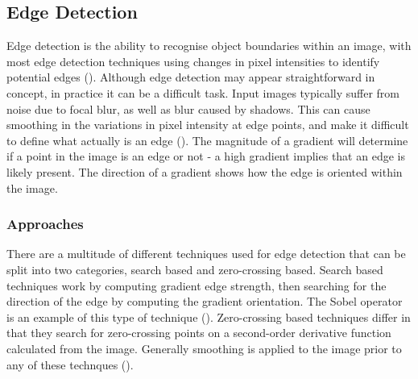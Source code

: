 \documentclass[12pt]{report}
\begin{document}
\subsection{Edge Detection}
\begin{flushleft}
Edge detection is the ability to recognise object boundaries within an image, with most edge detection techniques using changes in pixel intensities to identify potential edges (\cite{arbelaez2011contour}). Although edge detection may appear straightforward in concept, in practice it can be a difficult task. Input images typically suffer from noise due to focal blur, as well as blur caused by shadows. This can cause smoothing in the variations in pixel intensity at edge points, and make it difficult to define what actually is an edge (\cite{ziou1998edge}). The magnitude of a gradient will determine if a point in the image is an edge or not - a high gradient implies that an edge is likely present. The direction of a gradient shows how the edge is oriented within the image.
\end{flushleft}

\subsubsection*{Approaches}
\begin{flushleft}
There are a multitude of different techniques used for edge detection that can be split into two categories, search based and zero-crossing based. Search based techniques work by computing gradient edge strength, then searching for the direction of the edge by computing the gradient orientation. The Sobel operator is an example of this type of technique (\cite{gupta2013sobel}). Zero-crossing based techniques differ in that they search for zero-crossing points on a second-order derivative function calculated from the image. Generally smoothing is applied to the image prior to any of these technques (\cite{ziou1998edge}).
\end{flushleft}
\end{document}
